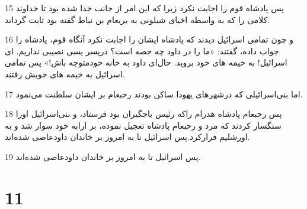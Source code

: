 \par 15 پس پادشاه قوم را اجابت نکرد زیرا که این امر از جانب خدا شده بود تا خداوند کلامی را که به واسطه اخیای شیلونی به یربعام بن نباط گفته بود ثابت گرداند.
\par 16 و چون تمامی اسرائیل دیدند که پادشاه ایشان را اجابت نکرد آنگاه قوم، پادشاه را جواب داده، گفتند: «ما را در داود چه حصه است؟ درپسر یسی نصیبی نداریم. ای اسرائیل! به خیمه های خود بروید. حال‌ای داود به خانه خودمتوجه باش!» پس تمامی اسرائیل به خیمه های خویش رفتند.
\par 17 اما بنی‌اسرائیلی که درشهرهای یهودا ساکن بودند رحبعام بر ایشان سلطنت می‌نمود.
\par 18 پس رحبعام پادشاه هدرام راکه رئیس باجگیران بود فرستاد، و بنی‌اسرائیل اورا سنگسار کردند که مرد و رحبعام پادشاه تعجیل نموده، بر ارابه خود سوار شد و به اورشلیم فرارکرد.پس اسرائیل تا به امروز بر خاندان داودعاصی شده‌اند.
\par 19 پس اسرائیل تا به امروز بر خاندان داودعاصی شده‌اند.
 
\chapter{11}

